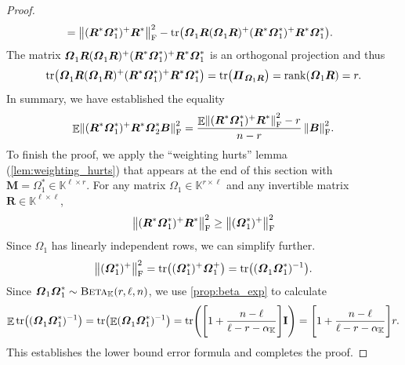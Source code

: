 \documentclass[11pt]{article}
\newcommand{\field}{\mathbb{K}}
\DeclareMathOperator{\tr}{tr}
\DeclareMathOperator{\rank}{rank}
\newcommand{\mat}[1]{\boldsymbol{#1}}
\newcommand{\norm}[1]{\mleft\| #1 \mright\|}
\newcommand{\Id}{\mathbf{I}}
\DeclareMathOperator{\expect}{\mathbb{E}}
\newcommand{\Beta}{\textnormal{\textsc{Beta}}}
\theoremstyle{definition}
\numberwithin{equation}{section}
\begin{document}
\begin{proof}
\begin{align*}
    &= \norm{ (\mat{R}^* \mat{\varOmega}_1^*)^{+} \mat{R}^* }_{\rm F}^2
    - \tr\bigl( \mat{\varOmega}_1^{\vphantom{*}} \mat{R} (\mat{\varOmega}_1^{\vphantom{*}} \mat{R})^{+} (\mat{R}^* \mat{\varOmega}_1^*)^{+} \mat{R}^* \mat{\varOmega}_1^* \bigr).
\end{align*}
%
The matrix $\mat{\varOmega}_1^{\vphantom{*}} \mat{R} (\mat{\varOmega}_1^{\vphantom{*}} \mat{R})^{+} (\mat{R}^* \mat{\varOmega}_1^*)^{+} \mat{R}^* \mat{\varOmega}_1^*$ is an orthogonal projection and thus
%
\begin{equation*}
    \tr\bigl( \mat{\varOmega}_1^{\vphantom{*}} \mat{R} (\mat{\varOmega}_1^{\vphantom{*}} \mat{R})^{+} (\mat{R}^* \mat{\varOmega}_1^*)^{+} \mat{R}^* \mat{\varOmega}_1^* \bigr)
    = \tr\bigl(\mat{\varPi}_{\mat{\varOmega}_1 \mat{R}} \bigr) 
    = \rank(\mat{\varOmega}_1 \mat{R})
    = r.
\end{equation*}
%
In summary, we have established the equality
\begin{equation*}
    \expect \norm{\smash{ (\mat{R}^* \mat{\varOmega}_1^*)^+ \mat{R}^* \mat{\varOmega}_2^* \mat{B}}}_{\rm F}^2 = \frac{\expect \norm{ (\mat{R}^* \mat{\varOmega}_1^*)^{+} \mat{R}^* }_{\rm F}^2 - r}{n-r} \, \norm{\mat{B}}_{\rm F}^2.
\end{equation*}
To finish the proof, we apply the ``weighting hurts'' lemma (\cref{lem:weighting_hurts}) that appears at the end of this section
with
$\mat{M}=\mat{\varOmega}_1^*\in\field^{\ell\times r}$. For any matrix $\mat{\varOmega}_1 \in \field^{r \times \ell}$ and any invertible matrix $\mat{R} \in \field^{\ell \times \ell}$,
\begin{equation*}
    \norm{ (\mat{R}^* \mat{\varOmega}_1^*)^{+} \mat{R}^* }_{\rm F}^2
    \geq \norm{ (\mat{\varOmega}_1^*)^{+}}_{\rm F}^2
\end{equation*}
Since $\mat{\varOmega}_1$ has linearly independent rows, we can simplify further.
%
\begin{equation*}
    \norm{ (\mat{\varOmega}_1^*)^{+} }_{\rm F}^2
    = \tr\bigl( (\mat{\varOmega}_1^*)^{+} \mat{\varOmega}_1^{+} \bigr)
    = \tr \bigl((\mat{\varOmega}_1^{\vphantom{*}} \mat{\varOmega}_1^*)^{-1}\bigr).
\end{equation*}
Since $\mat{\varOmega}_1 \mat{\varOmega}_1^* \sim \Beta_\field(r,\ell,n)$, we use \cref{prop:beta_exp} to calculate
\begin{equation*}
    \expect \tr \bigl((\mat{\varOmega}_1^{\vphantom{*}} \mat{\varOmega}_1^*)^{-1}\bigr)
    = \tr \bigl( \expect (\mat{\varOmega}_1^{\vphantom{*}} \mat{\varOmega}_1^*)^{-1}\bigr)
    = \tr \Biggl(\Biggl[1 + \frac{n -\ell}{\ell - r - \alpha_{\field}}\Biggr] \Id \Biggr)
    = \Biggl[1 + \frac{n -\ell}{\ell - r - \alpha_{\field}}\Biggr] r.
\end{equation*}
%
This establishes the lower bound error formula and completes the proof.
\end{proof}
\end{document}
